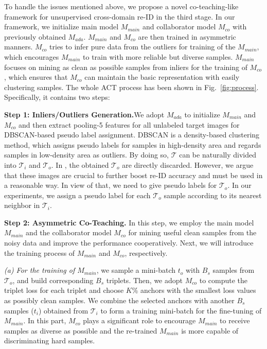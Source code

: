 \documentclass[letterpaper]{article} \usepackage{aaai20}  \usepackage{times}  \usepackage{helvet} \usepackage{courier}  \usepackage[hyphens]{url}  \usepackage{graphicx} \urlstyle{rm} \def\UrlFont{\rm}  \usepackage{graphicx}  \frenchspacing  \setlength{\pdfpagewidth}{8.5in}  \setlength{\pdfpageheight}{11in}  \usepackage{color}
\begin{document}
To handle the issues mentioned above, we propose a novel co-teaching-like framework for unsupervised cross-domain re-ID in the third stage. In our framework, we initialize main model $M_{main}$ and collaborator model $M_{co}$ with previously obtained $M_{ada}$. $M_{main}$ and $M_{co}$ are then trained in asymmetric manners. $M_{co}$ tries to infer pure data from the outliers for training of the $M_{main}$, which encourages $M_{main}$ to train with more reliable but diverse samples. $M_{main}$ focuses on mining as clean as possible samples from inliers for the training of $M_{co}$, which ensures that $M_{co}$ can maintain the basic representation with easily clustering samples. The whole ACT process has been shown in Fig.~\ref{fig:process}. Specifically, it contains two steps:


\textbf{Step 1: Inliers/Outliers Generation.}We adopt $M_{ada}$ to initialize $M_{main}$ and $M_{co}$ and then extract pooling-5 features for all unlabeled target images for DBSCAN-based pseudo label assignment. DBSCAN is a density-based clustering method, which assigns pseudo labels for samples in high-density area and regards samples in low-density area as outliers. By doing so, $\mathcal{T}$ can be naturally divided into $\mathcal{T}_{i}$ and $\mathcal{T}_{o}$. In \cite{song2018unsupervised}, the obtained $\mathcal{T}_{o}$ are directly discarded. However, we argue that these images are crucial to further boost re-ID accuracy and must be used in a reasonable way. In view of that, we need to give pseudo labels for $\mathcal{T}_{o}$. In our experiments, we assign a pseudo label for each $\mathcal{T}_{o}$ sample according to its nearest neighbor in $\mathcal{T}_{i}$.

\textbf{Step 2: Asymmetric Co-Teaching.} 
In this step, we employ the main model $M_{main}$ and the collaborator model $M_{co}$ for mining useful clean samples from the noisy data and improve the performance cooperatively. Next, we will introduce the training process of $M_{main}$ and $M_{co}$, respectively.


\textit{(a)	For the training of $M_{main}$}, we sample a mini-batch $t_o$ with $B_s$ samples from $\mathcal{T}_o$, and build corresponding $B_s$ triplets. Then, we adopt $M_{co}$ to compute the triplet loss for each triplet and choose $K$\% anchors with the smallest loss values as possibly clean samples. We combine the selected anchors with another $B_s$ samples ($t_i$) obtained from $\mathcal{T}_i$ to form a training mini-batch for the fine-tuning of $M_{main}$. In this part, $M_{co}$ plays a significant role to encourage $M_{main}$ to receive samples as diverse as possible and the re-trained $M_{main}$ is more capable of discriminating hard samples.
\end{document}
